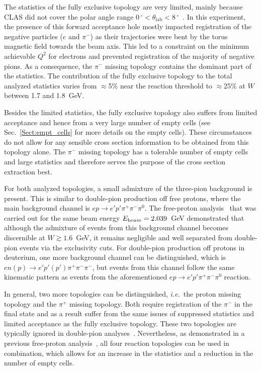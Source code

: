 \documentclass[prc,twocolumn,superscriptaddress,showpacs,amssymb,amsmath,amsfonts,aps,nofootinbib]{revtex4-1}
\begin{document}
The statistics of the fully exclusive topology are very limited, mainly because CLAS did not cover the polar angle range $0\,^{\circ}\mathrm{} < \theta_{\textrm{lab}} < 8\,^{\circ}\mathrm{}$~\cite{Mecking:2003zu}. In this experiment, the presence of this forward acceptance hole mostly impacted registration of the negative particles ($e$ and $\pi^{-}$) as their trajectories were bent by the torus magnetic field towards the beam axis. This led to a constraint on the minimum achievable $Q^2$ for electrons and prevented registration of the majority of negative pions. As a consequence, the $\pi^{-}$ missing topology contains the dominant part of the statistics. The contribution of the fully exclusive topology to the total analyzed statistics varies from $\approx$5\% near the reaction threshold to $\approx$25\% at $W$ between 1.7 and 1.8~GeV. 


 
Besides the limited statistics, the fully exclusive topology also suffers from limited acceptance and hence from a very large number of empty cells (see Sec.\!~\ref{Sect:empt_cells} for more details on the empty cells). These circumstances do not allow for any sensible cross section information to be obtained from this topology alone. The $\pi^{-}$ missing topology has a tolerable number of empty cells and large statistics and therefore serves the purpose of the cross section extraction best. 

For both analyzed topologies, a small admixture of the three-pion background is present. This is similar to double-pion production off free protons, where the main background channel is $ep\rightarrow e'p'\pi^{+}\pi^{-}\pi^{0}$.  The free-proton analysis~\cite{Fed_an_note:2017,Fed_paper_2018} that was carried out for the same beam energy $E_{\text beam} = 2.039$~GeV demonstrated that although the admixture of events from this background channel becomes discernible at $W\gtrsim 1.6$~GeV, it remains negligible and well separated from double-pion events via the exclusivity cuts. For double-pion production off protons in deuterium, one more background channel can be distinguished, which is $en(p) \rightarrow e'p'(p')\pi^{+}\pi^{-}\pi^{-}$, but events from this channel follow the same kinematic pattern as events from the aforementioned $ep\rightarrow e'p'\pi^{+}\pi^{-}\pi^{0}$ reaction.


In general, two more topologies can be distinguished, {\it i.e.}~the proton missing topology and the $\pi^{+}$ missing topology. Both require registration of the $\pi^{-}$ in the final state and as a result suffer from the same issues of suppressed statistics and limited acceptance as the fully exclusive topology.  These two topologies are typically ignored in double-pion analyses~\cite{Rip_an_note:2002,Ripani:2002ss,Fed_an_note:2007,Fedotov:2008aa,Isupov:2017lnd}. Nevertheless, as demonstrated in a previous free-proton analysis~\cite{Fed_an_note:2017,Fed_paper_2018}, all four reaction topologies can be used in combination, which allows for an increase in the statistics and a reduction in the number of empty cells.
\end{document}
